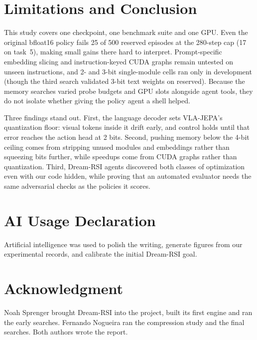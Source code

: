 \documentclass[conference]{IEEEtran}
\begin{document}
\section{Limitations and Conclusion}
\label{sec:conclusion}
This study covers one checkpoint, one benchmark suite and one GPU. Even the original bfloat16
policy fails 25 of 500 reserved episodes at the 280-step cap (17 on task~5), making small gains
there hard to interpret. Prompt-specific embedding slicing and instruction-keyed CUDA graphs remain
untested on unseen instructions, and 2- and 3-bit single-module cells ran only in development
(though the third search validated 3-bit text weights on reserved). Because the memory searches
varied probe budgets and GPU slots alongside agent tools, they do not isolate whether giving the
policy agent a shell helped.

Three findings stand out. First, the language decoder sets VLA-JEPA's quantization floor: visual
tokens inside it drift early, and control holds until that error reaches the action head at 2 bits.
Second, pushing memory below the 4-bit ceiling comes from stripping unused modules and embeddings
rather than squeezing bits further, while speedups come from CUDA graphs rather than quantization.
Third, Dream-RSI agents discovered both classes of optimization even with our code hidden, while
proving that an automated evaluator needs the same adversarial checks as the policies it scores.

\section*{AI Usage Declaration}
Artificial intelligence was used to polish the writing, generate figures from our experimental
records, and calibrate the initial Dream-RSI goal.

\section*{Acknowledgment}
Noah Sprenger brought Dream-RSI into the project, built its first engine and ran the early
searches. Fernando Nogueira ran the compression study and the final searches. Both authors wrote
the report.



\end{document}
